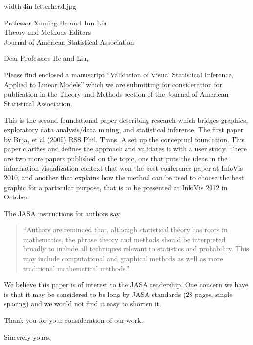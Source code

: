 \documentclass{letter}
\makeatletter
\def\apl#1#2{
\begin{letter}{#1}
\signature{Mahbubul Majumder\\
with Heike Hofmann and Dianne Cook\\Department of Statistics\\Iowa State University 
\\Ames, Iowa 50011-1210\\ Phone (515) 294 3440\\{\tt mahbub@iastate.edu}}
\opening{{Dear #2,}}

Please find enclosed a manuscript  ``Validation of Visual
Statistical Inference, Applied to Linear Models'' which we are
submitting for consideration for publication in the
Theory and Methods section of the Journal of American Statistical
Association.

This is the second foundational paper describing research which bridges
graphics, exploratory data analysis/data mining, and statistical
inference. The first paper by Buja, et al (2009) RSS Phil. Trans. A
set up the conceptual foundation. This paper clarifies and defines the
approach and validates it with a user study. There are two more papers
published on the topic, one that puts the ideas in the information
visualization context that won the best conference paper at InfoVis
2010, and another that explains how the method can be used to choose
the best graphic for a particular purpose, that is to be presented at
InfoVis 2012 in October.

The JASA instructions for authors say 

\begin{quote}
``Authors are reminded that, although statistical theory has roots in mathematics, the phrase theory and methods should be interpreted broadly to include all techniques relevant to statistics and probability. This may include computational and graphical methods as well as more traditional mathematical methods.''
\end{quote}
We believe this paper is of interest to  the JASA readership. One concern we have is that it may be
considered to be long by JASA standards (28 pages, single spacing) and
we would not find it easy to shorten it.

Thank you for your consideration of our work.

\closing{Sincerely yours,
}
\end{letter}}
\makeatother
\begin{document}
{{\pdfimage width 4in {letterhead.jpg}}}
\apl{Professor Xuming He and Jun Liu\\Theory and Methods Editors\\Journal of American Statistical Association}{Professors He and Liu}
\end{document}

